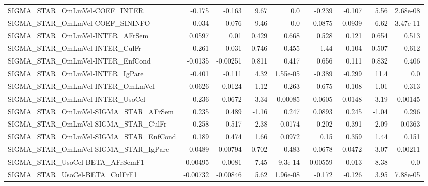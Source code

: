 \begin{tabular}{lrrrrrrrr}
SIGMA\_STAR\_OmLmVel-COEF\_INTER         &      -0.175 &       -0.163 &     9.67 &      0.0 &     -0.239 &      -0.107 &         5.56 &      2.68e-08 \\
SIGMA\_STAR\_OmLmVel-COEF\_SININFO       &      -0.034 &       -0.076 &     9.46 &      0.0 &     0.0875 &      0.0939 &         6.62 &      3.47e-11 \\
SIGMA\_STAR\_OmLmVel-INTER\_AFrSem       &      0.0597 &         0.01 &    0.429 &    0.668 &      0.528 &       0.121 &        0.654 &         0.513 \\
SIGMA\_STAR\_OmLmVel-INTER\_CulFr        &       0.261 &        0.031 &   -0.746 &    0.455 &       1.44 &       0.104 &       -0.507 &         0.612 \\
SIGMA\_STAR\_OmLmVel-INTER\_EnfCond      &     -0.0135 &     -0.00251 &    0.811 &    0.417 &      0.656 &       0.111 &        0.832 &         0.406 \\
SIGMA\_STAR\_OmLmVel-INTER\_IgPare       &      -0.401 &       -0.111 &     4.32 & 1.55e-05 &     -0.389 &      -0.299 &         11.4 &           0.0 \\
SIGMA\_STAR\_OmLmVel-INTER\_OmLmVel      &     -0.0626 &      -0.0124 &     1.12 &    0.263 &      0.675 &       0.108 &         1.01 &         0.313 \\
SIGMA\_STAR\_OmLmVel-INTER\_UsoCel       &      -0.236 &      -0.0672 &     3.34 &  0.00085 &    -0.0605 &     -0.0148 &         3.19 &       0.00145 \\
SIGMA\_STAR\_OmLmVel-SIGMA\_STAR\_AFrSem  &       0.235 &        0.489 &    -1.16 &    0.247 &     0.0893 &       0.245 &        -1.04 &         0.296 \\
SIGMA\_STAR\_OmLmVel-SIGMA\_STAR\_CulFr   &       0.258 &        0.517 &    -2.38 &   0.0174 &      0.202 &       0.391 &        -2.09 &        0.0363 \\
SIGMA\_STAR\_OmLmVel-SIGMA\_STAR\_EnfCond &       0.189 &        0.474 &     1.66 &   0.0972 &       0.15 &       0.359 &         1.44 &         0.151 \\
SIGMA\_STAR\_OmLmVel-SIGMA\_STAR\_IgPare  &      0.0489 &      0.00794 &    0.702 &    0.483 &    -0.0678 &     -0.0472 &         3.07 &       0.00211 \\
SIGMA\_STAR\_UsoCel-BETA\_AFrSemF1       &     0.00495 &       0.0081 &     7.45 &  9.3e-14 &   -0.00559 &      -0.013 &         8.38 &           0.0 \\
SIGMA\_STAR\_UsoCel-BETA\_CulFrF1        &    -0.00732 &     -0.00846 &     5.62 & 1.96e-08 &     -0.172 &      -0.126 &         3.95 &      7.88e-05 \\

\end{tabular}
